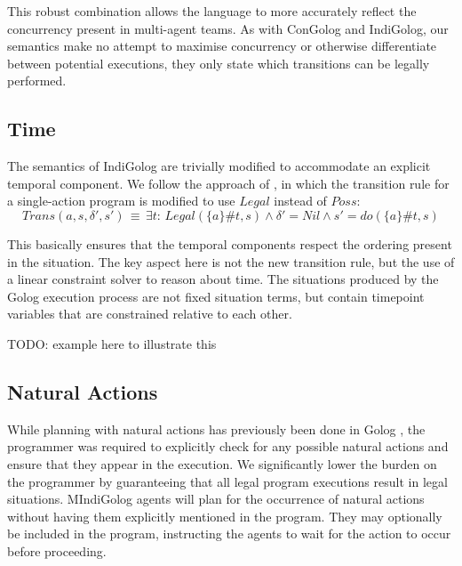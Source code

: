 This robust combination allows the language to more accurately reflect
the concurrency present in multi-agent teams. As with ConGolog and
IndiGolog, our semantics make no attempt to maximise concurrency or
otherwise differentiate between potential executions, they only state
which transitions can be legally performed.


\subsection{Time}

The semantics of IndiGolog are trivially modified to accommodate an
explicit temporal component. We follow the approach of \citep{Reiter98seq_temp_golog,reiter01kia},
in which the transition rule for a single-action program is modified
to use $Legal$ instead of $Poss$:\[
Trans(a,s,\delta',s')\,\equiv\,\exists t:\, Legal(\{a\}\#t,s)\wedge\delta'=Nil\wedge s'=do(\{a\}\#t,s)\]


This basically ensures that the temporal components respect the ordering
present in the situation. The key aspect here is not the new transition
rule, but the use of a linear constraint solver to reason about time.
The situations produced by the Golog execution process are not fixed
situation terms, but contain timepoint variables that are constrained
relative to each other.

TODO: example here to illustrate this


\subsection{Natural Actions}

While planning with natural actions has previously been done in Golog
\citep{pirri00planning_nat_acts}, the programmer was required to
explicitly check for any possible natural actions and ensure that
they appear in the execution. We significantly lower the burden on
the programmer by guaranteeing that all legal program executions result
in legal situations. MIndiGolog agents will plan for the occurrence
of natural actions without having them explicitly mentioned in the
program. They may optionally be included in the program, instructing
the agents to wait for the action to occur before proceeding.

